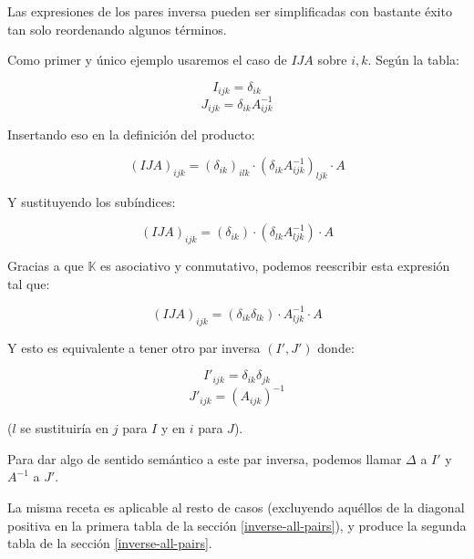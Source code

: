 Las expresiones de los pares inversa pueden ser simplificadas con bastante éxito tan solo reordenando algunos términos.

Como primer y único ejemplo usaremos el caso de $IJA$ sobre $i, k$. Según la tabla:

$$I_{ijk} = \delta_{ik}$$
$$J_{ijk} = \delta_{ik} A_{ijk}^{-1}$$

Insertando eso en la definición del producto:

$$(IJA)_{ijk} = (\delta_{ik})_{ilk} \cdot (\delta_{ik} A_{ijk}^{-1})_{ljk} \cdot A$$

Y sustituyendo los subíndices:

$$(IJA)_{ijk} = (\delta_{ik}) \cdot (\delta_{lk} A_{ljk}^{-1}) \cdot A$$

Gracias a que $\mathbb{K}$ es asociativo y conmutativo, podemos reescribir esta expresión tal que:

$$(IJA)_{ijk} = (\delta_{ik} \delta_{lk}) \cdot A_{ljk}^{-1} \cdot A$$

Y esto es equivalente a tener otro par inversa $(I', J')$ donde:

$$I'_{ijk} = \delta_{ik} \delta_{jk}$$
$$J'_{ijk} = (A_{ijk})^{-1}$$

($l$ se sustituiría en $j$ para $I$ y en $i$ para $J$).

Para dar algo de sentido semántico a este par inversa, podemos llamar $\Delta$ a $I'$ y $A^{-1}$ a $J'$.

La misma receta es aplicable al resto de casos (excluyendo aquéllos de la diagonal positiva en la primera tabla de la sección \ref{inverse-all-pairs}), y produce la segunda tabla de la sección \ref{inverse-all-pairs}.
